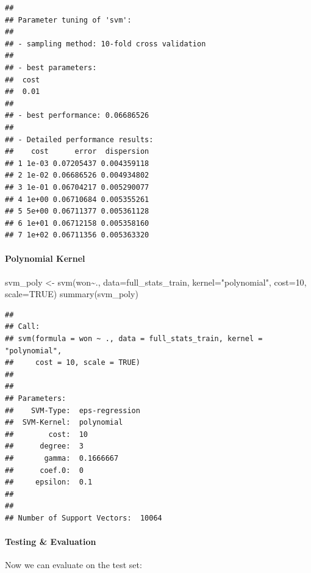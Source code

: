 \documentclass[
]{article}
\newenvironment{Shaded}{\begin{snugshade}}{\end{snugshade}}
\newcommand{\AttributeTok}[1]{\textcolor[rgb]{0.77,0.63,0.00}{#1}}
\newcommand{\ConstantTok}[1]{\textcolor[rgb]{0.00,0.00,0.00}{#1}}
\newcommand{\DecValTok}[1]{\textcolor[rgb]{0.00,0.00,0.81}{#1}}
\newcommand{\FunctionTok}[1]{\textcolor[rgb]{0.00,0.00,0.00}{#1}}
\newcommand{\NormalTok}[1]{#1}
\newcommand{\OtherTok}[1]{\textcolor[rgb]{0.56,0.35,0.01}{#1}}
\newcommand{\SpecialCharTok}[1]{\textcolor[rgb]{0.00,0.00,0.00}{#1}}
\newcommand{\StringTok}[1]{\textcolor[rgb]{0.31,0.60,0.02}{#1}}
\begin{document}
\begin{verbatim}
## 
## Parameter tuning of 'svm':
## 
## - sampling method: 10-fold cross validation 
## 
## - best parameters:
##  cost
##  0.01
## 
## - best performance: 0.06686526 
## 
## - Detailed performance results:
##    cost      error  dispersion
## 1 1e-03 0.07205437 0.004359118
## 2 1e-02 0.06686526 0.004934802
## 3 1e-01 0.06704217 0.005290077
## 4 1e+00 0.06710684 0.005355261
## 5 5e+00 0.06711377 0.005361128
## 6 1e+01 0.06712158 0.005358160
## 7 1e+02 0.06711356 0.005363320
\end{verbatim}

\hypertarget{polynomial-kernel}{%
\paragraph{Polynomial Kernel}\label{polynomial-kernel}}

\begin{Shaded}
\begin{Highlighting}[]
\NormalTok{svm\_poly }\OtherTok{\textless{}{-}} \FunctionTok{svm}\NormalTok{(won}\SpecialCharTok{\textasciitilde{}}\NormalTok{., }\AttributeTok{data=}\NormalTok{full\_stats\_train, }\AttributeTok{kernel=}\StringTok{"polynomial"}\NormalTok{, }\AttributeTok{cost=}\DecValTok{10}\NormalTok{, }\AttributeTok{scale=}\ConstantTok{TRUE}\NormalTok{)}
\FunctionTok{summary}\NormalTok{(svm\_poly)}
\end{Highlighting}
\end{Shaded}

\begin{verbatim}
## 
## Call:
## svm(formula = won ~ ., data = full_stats_train, kernel = "polynomial", 
##     cost = 10, scale = TRUE)
## 
## 
## Parameters:
##    SVM-Type:  eps-regression 
##  SVM-Kernel:  polynomial 
##        cost:  10 
##      degree:  3 
##       gamma:  0.1666667 
##      coef.0:  0 
##     epsilon:  0.1 
## 
## 
## Number of Support Vectors:  10064
\end{verbatim}

\hypertarget{testing-evaluation-1}{%
\paragraph{Testing \& Evaluation}\label{testing-evaluation-1}}

Now we can evaluate on the test set:
\end{document}
